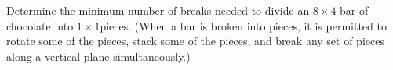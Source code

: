 Determine the minimum number of breaks needed to divide an $8\times 4$ bar of chocolate into $1\times 1 $pieces. (When a bar is broken into pieces, it is permitted to rotate some of the pieces, stack some of the pieces, and break any set of pieces along a vertical plane simultaneously.)
